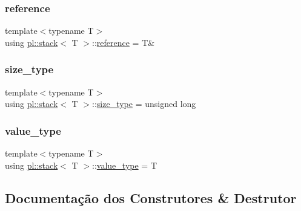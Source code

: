 \mbox{\label{classpl_1_1stack_a15ed30ec492b3112ec530d239670ee1b}} 
\subsubsection{\texorpdfstring{reference}{reference}}
{\footnotesize\ttfamily template$<$typename T$>$ \\
using \hyperlink{classpl_1_1stack}{pl\+::stack}$<$ T $>$\+::\hyperlink{classpl_1_1stack_a15ed30ec492b3112ec530d239670ee1b}{reference} =  T\&\hspace{0.3cm}{\ttfamily [private]}}

\mbox{\label{classpl_1_1stack_a062294c02a6a02f174a30e98e54ff880}} 
\subsubsection{\texorpdfstring{size\+\_\+type}{size\_type}}
{\footnotesize\ttfamily template$<$typename T$>$ \\
using \hyperlink{classpl_1_1stack}{pl\+::stack}$<$ T $>$\+::\hyperlink{classpl_1_1stack_a062294c02a6a02f174a30e98e54ff880}{size\+\_\+type} =  unsigned long\hspace{0.3cm}{\ttfamily [private]}}

\mbox{\label{classpl_1_1stack_a2297d235c54cb53f6b8c4be2a324deee}} 
\subsubsection{\texorpdfstring{value\+\_\+type}{value\_type}}
{\footnotesize\ttfamily template$<$typename T$>$ \\
using \hyperlink{classpl_1_1stack}{pl\+::stack}$<$ T $>$\+::\hyperlink{classpl_1_1stack_a2297d235c54cb53f6b8c4be2a324deee}{value\+\_\+type} =  T\hspace{0.3cm}{\ttfamily [private]}}



\subsection{Documentação dos Construtores \& Destrutor}
\mbox{\label{classpl_1_1stack_a80f544bbc443e2cedfaa1c5a46376035}} 
